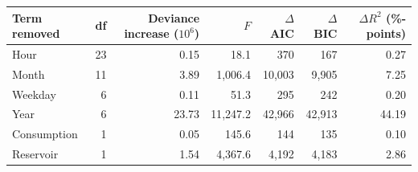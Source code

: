 \begin{tabular}{lrrrrrr}
\toprule
Term removed & df & Deviance increase ($10^6$) & $F$ & $\Delta$AIC & $\Delta$BIC & $\Delta R^2$ (\%-points) \\
\midrule
Hour & 23 & 0.15 & 18.1 & 370 & 167 & 0.27 \\
Month & 11 & 3.89 & 1{,}006.4 & 10{,}003 & 9{,}905 & 7.25 \\
Weekday &  6 & 0.11 & 51.3 & 295 & 242 & 0.20 \\
Year &  6 & 23.73 & 11{,}247.2 & 42{,}966 & 42{,}913 & 44.19 \\
Consumption &  1 & 0.05 & 145.6 & 144 & 135 & 0.10 \\
Reservoir &  1 & 1.54 & 4{,}367.6 & 4{,}192 & 4{,}183 & 2.86 \\
\bottomrule
\end{tabular}
